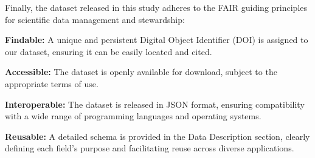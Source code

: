 
Finally, the dataset released in this study adheres to the FAIR guiding principles for scientific data management and stewardship:

\textbf{Findable:} A unique and persistent Digital Object Identifier (DOI) is assigned to our dataset, ensuring it can be easily located and cited.

\textbf{Accessible:} The dataset is openly available for download, subject to the appropriate terms of use.

\textbf{Interoperable:} The dataset is released in JSON format, ensuring compatibility with a wide range of programming languages and operating systems.

\textbf{Reusable:} A detailed schema is provided in the Data Description section, clearly defining each field's purpose and facilitating reuse across diverse applications. 
